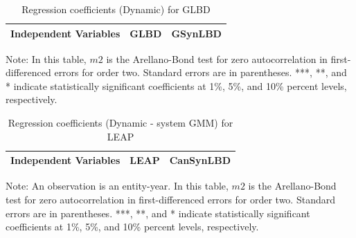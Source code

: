 \begin{table}[H]
  \centering
 \caption{Regression coefficients (Dynamic) for GLBD} \label{Dynamic - GMM} \medskip
\renewcommand{\arraystretch}{1}
\begin{tabular}{l|c |c}
\toprule
\textbf{Independent Variables}&\textbf{GLBD} &\textbf{GSynLBD}\\
\midrule

   \bottomrule
  \end{tabular} 
\begin{tablenotes}
\small
\item Note: In this table, $m2$ is the Arellano-Bond test for zero autocorrelation in first-differenced errors for order two. Standard errors are in parentheses. ***, **, and * indicate statistically significant coefficients at 1\%, 5\%, and 10\% percent levels, respectively.
 \end{tablenotes}
\end{table}




\begin{table}[H]
  \centering
\begin{threeparttable}
 \caption{Regression coefficients (Dynamic - system GMM) for LEAP} \label{Dynamic - system GMM} \medskip
\renewcommand{\arraystretch}{1}
\begin{tabular}{l|c c| c c}
\toprule
\textbf{Independent Variables}&\multicolumn{2}{c|}{\textbf{LEAP}} &  \multicolumn{2}{c}{\textbf{CanSynLBD}}\\
\midrule

   \bottomrule
  \end{tabular} 
\begin{tablenotes}
\small
\item Note: An observation is an entity-year. In this table, $m2$ is the Arellano-Bond test for zero autocorrelation in first-differenced errors for order two. Standard errors are in parentheses. ***, **, and * indicate statistically significant coefficients at 1\%, 5\%, and 10\% percent levels, respectively.
 \end{tablenotes}
 \end{threeparttable}
\end{table}

